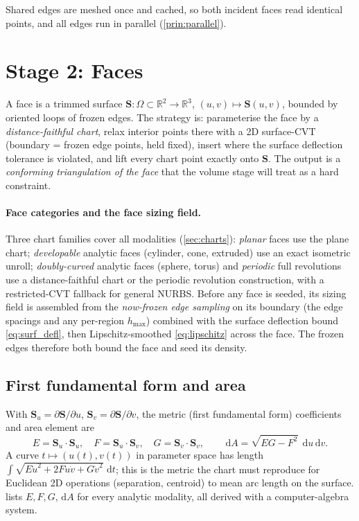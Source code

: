 \documentclass[11pt,a4paper]{article}
\numberwithin{equation}{section}
\newcommand{\R}{\mathbb{R}}
\newcommand{\vv}[1]{\mathbf{#1}}
\newcommand{\dd}{\,\mathrm{d}}
\newcommand{\Su}{\vv{S}_u}
\newcommand{\Sv}{\vv{S}_v}
\begin{document}
\noindent
Shared edges are meshed once and cached, so both incident faces read identical
points, and all edges run in parallel (\cref{prin:parallel}).

\section{Stage 2: Faces}
\label{sec:faces}

A face is a trimmed surface $\vv{S}:\Omega\subset\R^2\to\R^3$, $(u,v)\mapsto
\vv{S}(u,v)$, bounded by oriented loops of frozen edges. The strategy is:
parameterise the face by a \emph{distance-faithful chart}, relax interior points
there with a 2D surface-CVT (boundary = frozen edge points, held fixed), insert
where the surface deflection tolerance is violated, and lift every chart point
exactly onto $\vv{S}$. The output is a \emph{conforming triangulation of the
face} that the volume stage will treat as a hard constraint.

\paragraph{Face categories and the face sizing field.}
Three chart families cover all modalities (\cref{sec:charts}): \emph{planar}
faces use the plane chart; \emph{developable} analytic faces (cylinder, cone,
extruded) use an exact isometric unroll; \emph{doubly-curved} analytic faces
(sphere, torus) and \emph{periodic} full revolutions use a distance-faithful
chart or the periodic revolution construction, with a restricted-CVT fallback
for general NURBS. Before any face is seeded, its sizing field is assembled from
the \emph{now-frozen edge sampling} on its boundary (the edge spacings and any
per-region $h_{\max}$) combined with the surface deflection bound
\eqref{eq:surf_defl}, then Lipschitz-smoothed \eqref{eq:lipschitz} across the
face. The frozen edges therefore both bound the face and seed its density.

\subsection{First fundamental form and area}
With $\Su=\partial\vv{S}/\partial u$, $\Sv=\partial\vv{S}/\partial v$, the metric
(first fundamental form) coefficients and area element are
\begin{equation}
\label{eq:fff}
E=\Su\!\cdot\!\Su,\quad F=\Su\!\cdot\!\Sv,\quad G=\Sv\!\cdot\!\Sv,
\qquad \dd A=\sqrt{EG-F^2}\;\dd u\dd v .
\end{equation}
A curve $t\mapsto(u(t),v(t))$ in parameter space has length
$\int\sqrt{E\dot u^2+2F\dot u\dot v+G\dot v^2}\,\dd t$; this is the metric the
chart must reproduce for Euclidean 2D operations (separation, centroid) to mean
arc length on the surface.  lists $E,F,G,\dd A$ for every analytic
modality, all derived with a computer-algebra system.
\end{document}
